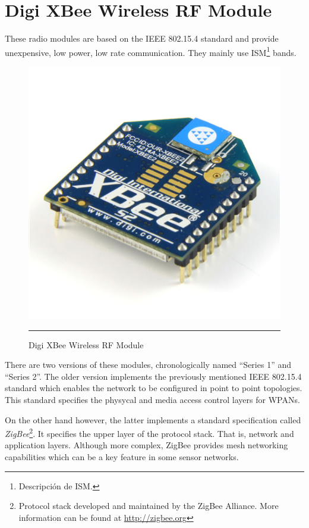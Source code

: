 
\section{Digi XBee\textregistered{} Wireless RF Module}
\label{sec:xbee}

These radio modules are based on the IEEE 802.15.4 standard and provide unexpensive, low power, low rate communication. They mainly use ISM\footnote{Descripción de ISM.} bands. 

\begin{figure}[htbp]
    \centering
    \includegraphics[scale=0.4]{./Figures/xbee.png}
        \rule{35em}{0.5pt}
        \caption[Digi XBee RF Module]{Digi XBee\textregistered{} Wireless RF Module}
    \label{fig:XBee RF Module}
\end{figure}

There are two versions of these modules, chronologically named ``Series 1'' and ``Series 2''. The older version implements the previously mentioned IEEE 802.15.4 standard which enables the network to be configured in point to point topologies. This standard specifies the physycal and media access control layers for WPANs.

On the other hand however, the latter implements a standard specification called \emph{ZigBee}\footnote{Protocol stack developed and maintained by the ZigBee Alliance. More information can be found at \url{http://zigbee.org}}. It specifies the upper layer of the protocol stack. That is, network and application layers. Although more complex, ZigBee provides mesh networking capabilities which can be a key feature in some sensor networks.

